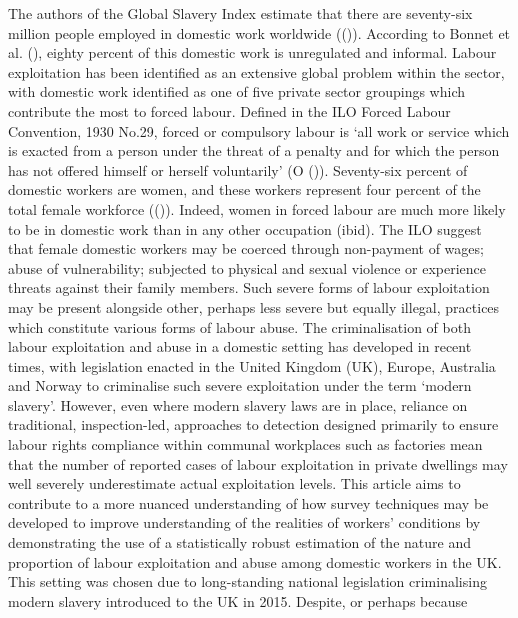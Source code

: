 \documentclass[
  12pt,
]{article}
\theoremstyle{plain}
\theoremstyle{definition}
\begin{document}
The authors of the Global Slavery Index estimate that there are
seventy-six million people employed in domestic work worldwide
(()).
According to Bonnet et al. (),
eighty percent of this domestic work is unregulated and informal. Labour
exploitation has been identified as an extensive global problem within
the sector, with domestic work identified as one of five private sector
groupings which contribute the most to forced labour. Defined in the ILO
Forced Labour Convention, 1930 No.29, forced or compulsory labour is
`all work or service which is exacted from a person under the threat of
a penalty and for which the person has not offered himself or herself
voluntarily' (O ()). Seventy-six
percent of domestic workers are women, and these workers represent four
percent of the total female workforce
(()).
Indeed, women in forced labour are much more likely to be in domestic
work than in any other occupation (ibid). The ILO suggest that female
domestic workers may be coerced through non-payment of wages; abuse of
vulnerability; subjected to physical and sexual violence or experience
threats against their family members. Such severe forms of labour
exploitation may be present alongside other, perhaps less severe but
equally illegal, practices which constitute various forms of labour
abuse. The criminalisation of both labour exploitation and abuse in a
domestic setting has developed in recent times, with legislation enacted
in the United Kingdom (UK), Europe, Australia and Norway to criminalise
such severe exploitation under the term `modern slavery'. However, even
where modern slavery laws are in place, reliance on traditional,
inspection-led, approaches to detection designed primarily to ensure
labour rights compliance within communal workplaces such as factories
mean that the number of reported cases of labour exploitation in private
dwellings may well severely underestimate actual exploitation levels.
This article aims to contribute to a more nuanced understanding of how
survey techniques may be developed to improve understanding of the
realities of workers' conditions by demonstrating the use of a
statistically robust estimation of the nature and proportion of labour
exploitation and abuse among domestic workers in the UK. This setting
was chosen due to long-standing national legislation criminalising
modern slavery introduced to the UK in 2015. Despite, or perhaps because
\end{document}
